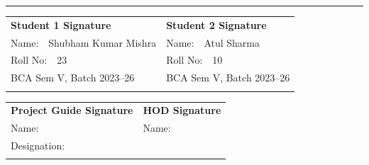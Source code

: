 \documentclass[12pt,a4paper]{article}
\begin{document}
\vspace{2cm}
\noindent\textcolor{darkgray!40}{\rule{\textwidth}{0.4pt}}

\vspace{1.2cm}
\begin{tabular}{@{} L{7cm} L{7cm} @{}}
\textbf{Student 1 Signature} & \textbf{Student 2 Signature} \\[0.4cm]
Name:\ \ Shubham Kumar Mishra & Name:\ \ Atul Sharma \\
Roll No:\ \ 23                & Roll No:\ \ 10 \\
BCA Sem V, Batch 2023--26    & BCA Sem V, Batch 2023--26 \\[1.8cm]
\underline{\hspace{5.5cm}}   & \underline{\hspace{5.5cm}} \\[1.2cm]
\end{tabular}

\begin{tabular}{@{} L{7cm} L{7cm} @{}}
\textbf{Project Guide Signature} & \textbf{HOD Signature} \\[0.4cm]
Name:\ \ \underline{\hspace{4.5cm}} & Name:\ \ \underline{\hspace{4.5cm}} \\
Designation:\ \ \underline{\hspace{3.8cm}} & \\[1.8cm]
\underline{\hspace{5.5cm}} & \underline{\hspace{5.5cm}} \\
\end{tabular}
\end{document}
